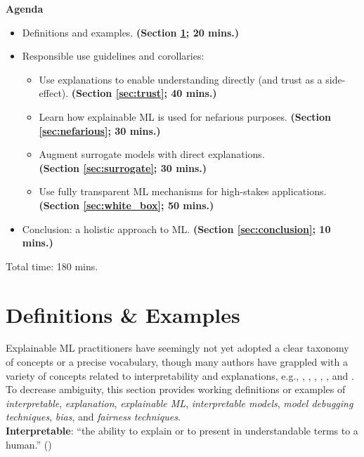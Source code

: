 \documentclass[sigconf]{acmart}
\begin{document}
\vspace{-8pt}
\noindent \textbf{Agenda}
\begin{itemize}
\item Definitions and examples. \textbf{(Section \ref{sec:intro}; 20 mins.)}
\item Responsible use guidelines and corollaries:
\begin{itemize}
	\item Use explanations to enable understanding directly (and trust as a side-effect). \textbf{(Section \ref{sec:trust}; 40 mins.)}
	\item Learn how explainable ML is used for nefarious purposes. \textbf{(Section \ref{sec:nefarious}; 30 mins.)}
	\item Augment surrogate models with direct explanations.\\\textbf{(Section \ref{sec:surrogate}; 30 mins.)}
	\item Use fully transparent ML mechanisms for high-stakes applications. \textbf{(Section \ref{sec:white_box}; 50 mins.)}
\end{itemize}
\item Conclusion: a holistic approach to ML. \textbf{(Section \ref{sec:conclusion}; 10 mins.)}
\end{itemize}
\noindent Total time: 180 mins.

\section{Definitions \& Examples} \label{sec:intro}

Explainable ML practitioners have seemingly not yet adopted a clear taxonomy of concepts or a precise vocabulary, though many authors have grappled with a variety of concepts related to interpretability and explanations, e.g., \citet{gilpin2018explaining}, \citet{guidotti2018survey}, \citet{lipton1}, \citet{molnar}, \citet{murdoch2019interpretable}, and \citet{weller2017challenges}. To decrease ambiguity, this section provides working definitions or examples of \textit{interpretable}, \textit{explanation}, \textit{explainable ML}, \textit{interpretable models}, \textit{model debugging techniques}, \textit{bias}, and \textit{fairness techniques}.\\

\vspace{-8pt}
\noindent\textbf{Interpretable}: ``the ability to explain or to present in understandable terms to a human.'' (\citet{been_kim1})\\
\end{document}
